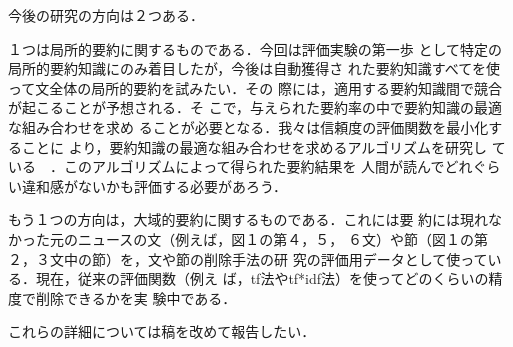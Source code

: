 今後の研究の方向は２つある．

１つは局所的要約に関するものである．今回は評価実験の第一歩
として特定の局所的要約知識にのみ着目したが，今後は自動獲得さ
れた要約知識すべてを使って文全体の局所的要約を試みたい．その
際には，適用する要約知識間で競合が起こることが予想される．そ
こで，与えられた要約率の中で要約知識の最適な組み合わせを求め
ることが必要となる．我々は信頼度の評価関数を最小化することに
より，要約知識の最適な組み合わせを求めるアルゴリズムを研究し
ている~\cite{Katoh98}~．このアルゴリズムによって得られた要約結果を
人間が読んでどれぐらい違和感がないかも評価する必要があろう．

もう１つの方向は，大域的要約に関するものである．これには要
約には現れなかった元のニュースの文（例えば，図１の第４，５，
６文）や節（図１の第２，３文中の節）を，文や節の削除手法の研
究の評価用データとして使っている．現在，従来の評価関数（例え
ば，tf法やtf*idf法）を使ってどのくらいの精度で削除できるかを実
験中である．

これらの詳細については稿を改めて報告したい．






\newpage
\begin{biography}


\end{biography}





